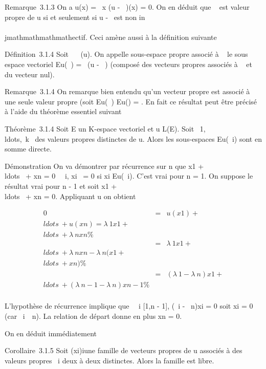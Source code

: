 Remarque~3.1.3 On a u(x) = \lambda~x \Leftrightarrow (u -
\lambda~\mathrmIdE)(x) = 0. On en déduit que \lambda~ est
valeur propre de u si et seulement si u -
\lambda~\mathrmIdE est non in\\\\jmathmathmathmathectif. Ceci amène
aussi à la définition suivante

Définition~3.1.4 Soit \lambda~
\in{}~(u). On appelle
sous-espace propre associé à \lambda~ le sous espace vectoriel Eu(\lambda~)
= \mathrmKer~(u -
\lambda~\mathrmIdE) (composé des vecteurs propres
associés à \lambda~ et du vecteur nul).

Remarque~3.1.4 On remarque bien entendu qu'un vecteur propre est associé
à une seule valeur propre (soit Eu(\lambda~) \bigcap Eu(\mu) =
\0\). En fait ce résultat peut être
précisé à l'aide du théorème essentiel suivant

Théorème~3.1.4 Soit E un K-espace vectoriel et u \in L(E). Soit
\lambda~1,\\ldots,\lambda~k~
des valeurs propres distinctes de u. Alors les sous-espaces
Eu(\lambda~i) sont en somme directe.

Démonstration On va démontrer par récurrence sur n que x1 +
\\ldots~ +
xn = 0 \rigtharrow~\forall~i, xi~ = 0 si
xi \in Eu(\lambda~i). C'est vrai pour n = 1. On
suppose le résultat vrai pour n - 1 et soit x1 +
\\ldots~ +
xn = 0. Appliquant u on obtient

\begin{align*} 0& =& u(x1) +
\\ldots~ +
u(xn) = \lambda~1x1 +
\\ldots~ +
\lambda~nxn\%& \\ & =&
\lambda~1x1 +
\\ldots~ +
\lambda~nxn - \lambda~n(x1 +
\\ldots~ +
xn) \%& \\ & =& (\lambda~1
- \lambda~n)x1 +
\\ldots~ +
(\lambda~n-1 - \lambda~n)xn-1 \%&
\\ \end{align*}

L'hypothèse de récurrence implique que \forall~~i \in
{[}1,n - 1{]}, (\lambda~i - \lambda~n)xi = 0 soit
xi = 0 (car
\lambda~i\neq~\lambda~n). La relation de
départ donne en plus xn = 0.

On en déduit immédiatement

Corollaire~3.1.5 Soit (xi)i\inI une famille de
vecteurs propres de u associés à des valeurs propres \lambda~i deux à
deux distinctes. Alors la famille est libre.

